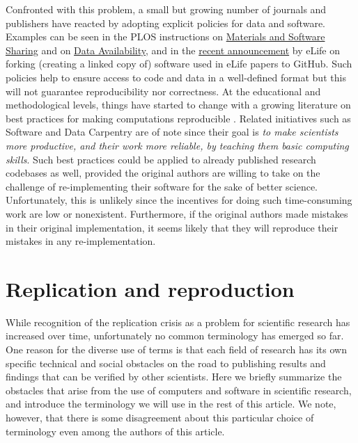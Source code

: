 \documentclass[a4paper,10pt, twocolumn]{article}
\begin{document}
Confronted with this problem, a small but growing number of journals and
publishers have reacted by adopting explicit policies for data and software. Examples can be seen in the PLOS instructions on
\href{http://journals.plos.org/plosone/s/materials-and-software-sharing}{Materials
  and Software Sharing} and
on \href{http://journals.plos.org/plosone/s/data-availability}{Data Availability},
and in the
\href{https://elifesciences.org/elife-news/inside-elife-forking-software-used-elife-papers-github}{recent
  announcement} by eLife on forking (creating a linked copy of) software used in eLife papers to GitHub.
Such policies help to ensure access to code and data in a well-defined format
\citep{perkel:2016} but this will not guarantee reproducibility nor
correctness.
At the educational and methodological levels, things have started to change with a
growing literature on best practices for making computations reproducible
\citep{sandve:2013, crook:2013, wilson:2014, halchenko:2015, janz:2015,
  hinsen:2015}.
  Related initiatives such as Software and Data Carpentry
\citep{wilson:2016} are of note since their goal is {\em to make
scientists more productive, and their work more reliable, by teaching them basic computing skills}.
Such best practices could be applied to already published research codebases as well, provided the original authors are willing to take on the challenge of 
re-implementing their software for the sake of better science.
Unfortunately, this is unlikely since the
incentives for doing such time-consuming work are low or nonexistent.
Furthermore, if the original authors made mistakes in their original
implementation, it seems likely that they will reproduce their mistakes
in any re-implementation.\\


\section*{Replication and reproduction}
\label{sec:replication-reproduction}
While recognition of the replication crisis as a problem
for scientific research has increased over time, unfortunately no 
common terminology has emerged so far. One reason for
the diverse use of terms is that each field of research has its own
specific technical and social obstacles on the road to publishing
results and findings that can be verified by other scientists. Here we
briefly summarize the obstacles that arise from the use of computers
and software in scientific research, and introduce the terminology we
will use in the rest of this article. We note, however, that there is
some disagreement about this particular choice of terminology even
among the authors of this article. \\
\end{document}
